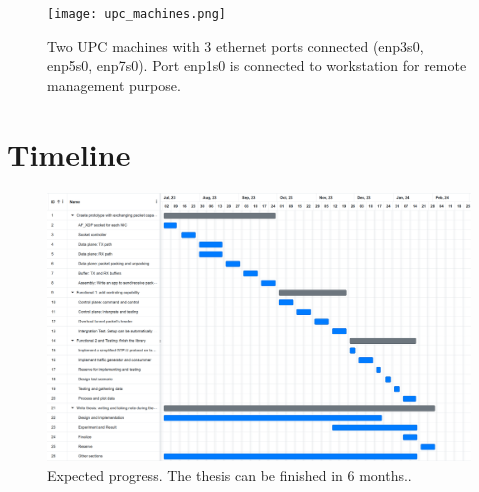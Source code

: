 \begin{figure}[H]
	\centering
	\texttt{[image: upc\_machines.png]}
	\caption{Two UPC machines with 3 ethernet ports connected (enp3s0, enp5s0, enp7s0). Port enp1s0 is connected to workstation for remote management purpose.}
	\label{fig:plan:upc_machines}
\end{figure}


\clearpage
\section{Timeline}

\begin{figure}
    \centering
    \includegraphics[width=1.0\textwidth]{resources/images/TIMELINE.PNG}
    \caption{Expected progress. The thesis can be finished in 6 months..}
  \end{figure}









